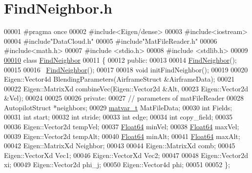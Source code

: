 \hypertarget{_find_neighbor_8h_source}{}\section{Find\+Neighbor.\+h}
\label{_find_neighbor_8h_source}

\begin{DoxyCode}
00001 \textcolor{preprocessor}{#pragma once}
00002 \textcolor{preprocessor}{#include<Eigen/dense>}
00003 \textcolor{preprocessor}{#include<iostream>}
00004 \textcolor{preprocessor}{#include"DataCloud.h"}
00005 \textcolor{preprocessor}{#include"MatFileReader.h"}
00006 \textcolor{preprocessor}{#include<math.h>}
00007 \textcolor{preprocessor}{#include <stdio.h>}
00008 \textcolor{preprocessor}{#include <stdlib.h>}
00009 
\hyperlink{class_find_neighbor}{00010} \textcolor{keyword}{class }\hyperlink{class_find_neighbor}{FindNeighbor}
00011 \{
00012 \textcolor{keyword}{public}:
00013 
00014     \hyperlink{class_find_neighbor}{FindNeighbor}();
00015 
00016     ~\hyperlink{class_find_neighbor}{FindNeighbor}();
00017 
00018     \textcolor{keywordtype}{void} initFindNeighbor();
00019 
00020     Eigen::Vector4d BlendingParameters(AirframeStruct &AirframeData);
00021 
00022     Eigen::MatrixXd combineVec(Eigen::Vector2d &Alt, 
00023                                Eigen::Vector2d &Vel);
00024     
00025     
00026 \textcolor{keyword}{private}:
00027     \textcolor{comment}{// parameters of matFileReader}
00028     AutopilotStruct *neighbors;
00029     \hyperlink{group___m_a_t_structmatvar__t}{matvar\_t} MatFileData;
00030     \textcolor{keywordtype}{int} Fields;
00031     \textcolor{keywordtype}{int} start;
00032     \textcolor{keywordtype}{int} stride;
00033     \textcolor{keywordtype}{int} edge;
00034     \textcolor{keywordtype}{int} copy\_field;
00035 
00036     Eigen::Vector2d tempVel;
00037     \hyperlink{group___tools_ga3f1431cb9f76da10f59246d1d743dc2c}{Float64} minVel;
00038     \hyperlink{group___tools_ga3f1431cb9f76da10f59246d1d743dc2c}{Float64} maxVel;
00039     Eigen::Vector2d tempAlt;
00040     \hyperlink{group___tools_ga3f1431cb9f76da10f59246d1d743dc2c}{Float64} minAlt;
00041     \hyperlink{group___tools_ga3f1431cb9f76da10f59246d1d743dc2c}{Float64} maxAlt;
00042     Eigen::MatrixXd Neighbor;
00043 
00044     Eigen::MatrixXd comb;
00045     Eigen::VectorXd Vec1;
00046     Eigen::VectorXd  Vec2;
00047 
00048     Eigen::Vector2d xi;
00049     Eigen::Vector2d phi\_j;
00050     Eigen::Vector4d phi;
00051 
00052 \};
\end{DoxyCode}
